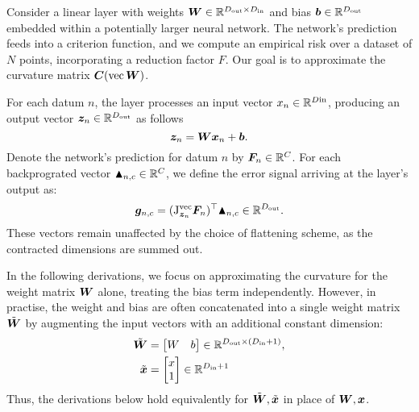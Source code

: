 \begin{setup}\label{setup:linear_layer}
  Consider a linear layer with weights ${\bm{W}} \in {\mathbb{R}}^{D_{\text{out}}\times D_{\text{in}}}$ and bias ${\bm{b}} \in {\mathbb{R}}^{D_{\text{out}}}$ embedded within a potentially larger neural network.
  The network's prediction feeds into a criterion function, and we compute an empirical risk over a dataset of $N$ points, incorporating a reduction factor $F$.
  Our goal is to approximate the curvature matrix ${\bm{C}}(\operatorname{vec} {\bm{W}})$.

  For each datum $n$, the layer processes an input vector $x_n \in {\mathbb{R}}^{D {\text{in}}}$, producing an output vector ${\bm{z}}_{n} \in {\mathbb{R}}^{D_{\text{out}}}$ as follows
  $$ {\bm{z}}_{n} = {\bm{W}} {\bm{x}}_{n} + {\bm{b}}.$$
  Denote the network's prediction for datum $n$ by ${\bm{F}}_n \in {\mathbb{R}}^{C}$.
  For each backprograted vector $\blacktriangle_{n,c} \in {\mathbb{R}}^{C}$, we define the error signal arriving at the layer's output as:
  $${\bm{g}}_{n,c} = (\mathrm{J}^{\operatorname{vec}}_{{\bm{z}}_{n}} {\bm{F}}_n)^{\top} \blacktriangle_{n,c} \in {\mathbb{R}}^{D_{\text{out}}}.$$
  These vectors remain unaffected by the choice of flattening scheme, as the contracted dimensions are summed out.

  In the following derivations, we focus on approximating the curvature for the weight matrix ${\bm{W}}$ alone, treating the bias term independently.
  However, in practise, the weight and bias are often concatenated into a single weight matrix $\tilde{{\bm{W}}}$ by augmenting the input vectors with an additional constant dimension:
  \begin{align*}
    \tilde{{\bm{W}}} &= \begin{bmatrix} W & b \end{bmatrix} \in {\mathbb{R}}^{D_{\text{out}} \times (D_{\text{in}} + 1)}, \\
    \tilde{{\bm{x}}} &= \begin{bmatrix} x \\ 1 \end{bmatrix} \in {\mathbb{R}}^{D_{\text{in}} + 1}
  \end{align*}
  Thus, the derivations below hold equivalently for $\tilde{{\bm{W}}}, \tilde{{\bm{x}}}$ in place of ${\bm{W}}, {\bm{x}}$.
\end{setup}

